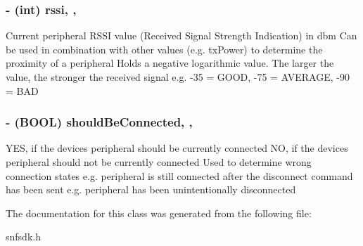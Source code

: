 \subsubsection[{rssi}]{\setlength{\rightskip}{0pt plus 5cm}-\/ (int) rssi\hspace{0.3cm}{\ttfamily [read]}, {\ttfamily [nonatomic]}, {\ttfamily [assign]}}\label{interface_le_device_a79b699be0bd017548d1b3537fd2c9f6a}
Current peripheral R\+S\+S\+I value (Received Signal Strength Indication) in dbm Can be used in combination with other values (e.\+g. tx\+Power) to determine the proximity of a peripheral Holds a negative logarithmic value. The larger the value, the stronger the received signal e.\+g. -\/35 = G\+O\+O\+D, -\/75 = A\+V\+E\+R\+A\+G\+E, -\/90 = B\+A\+D \hypertarget{interface_le_device_a09b98b7f29cabb5a1e7a2b850457c27b}{}
\subsubsection[{should\+Be\+Connected}]{\setlength{\rightskip}{0pt plus 5cm}-\/ (B\+O\+O\+L) should\+Be\+Connected\hspace{0.3cm}{\ttfamily [read]}, {\ttfamily [nonatomic]}, {\ttfamily [assign]}}\label{interface_le_device_a09b98b7f29cabb5a1e7a2b850457c27b}
Y\+E\+S, if the device\textquotesingle{}s peripheral should be currently connected N\+O, if the device\textquotesingle{}s peripheral should not be currently connected Used to determine wrong connection states e.\+g. peripheral is still connected after the disconnect command has been sent e.\+g. peripheral has been unintentionally disconnected 

The documentation for this class was generated from the following file\+:\begin{DoxyCompactItemize}
\item 
snfsdk.\+h\end{DoxyCompactItemize}
